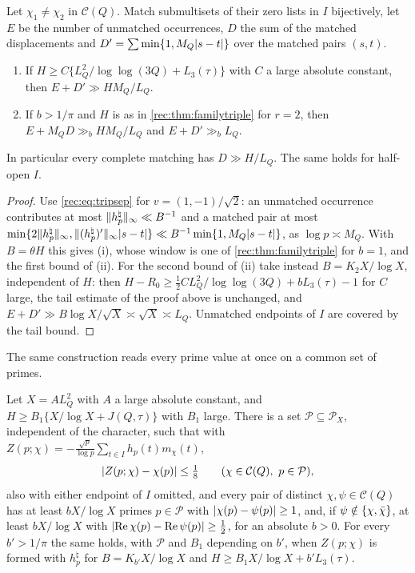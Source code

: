 \begin{corollary}\label{rec:cor:lowmatch}
Let $\chi_1\ne\chi_2$ in $\mathcal C(Q)$. Match submultisets of their zero lists in $I$ bijectively, let $E$ be the
number of unmatched occurrences, $D$ the sum of the matched displacements and
$D'=\sum\min\{1,M_Q\lvert s-t\rvert\}$ over the matched pairs $(s,t)$.
\begin{enumerate}
\item If $H\ge C\{L_Q^2/\log\log(3Q)+L_3(\tau)\}$ with $C$ a large absolute constant, then $E+D'\gg HM_Q/L_Q$.
\item If $b>1/\pi$ and $H$ is as in \cref{rec:thm:familytriple} for $r=2$, then $E+M_QD\gg_bHM_Q/L_Q$ and
$E+D'\gg_bL_Q$.
\end{enumerate}
In particular every complete matching has $D\gg H/L_Q$. The same holds for half-open $I$.
\end{corollary}

\begin{proof}
Use \eqref{rec:eq:tripsep} for $v=(1,-1)/\sqrt2$: an unmatched occurrence contributes at most
$\lVert h_p^\natural\rVert_\infty\ll B^{-1}$ and a matched pair at most
$\min\{2\lVert h_p^\natural\rVert_\infty,\lVert(h_p^\natural)'\rVert_\infty\lvert s-t\rvert\}\ll B^{-1}\min\{1,M_Q\lvert s-t\rvert\}$, as $\log p\asymp M_Q$. With
$B=\theta H$ this gives (i), whose window is one of \cref{rec:thm:familytriple} for $b=1$, and the first
bound of (ii). For the second bound of (ii) take instead $B=K_2X/\log X$, independent of $H$: then
$H-R_0\ge\tfrac12CL_Q^2/\log\log(3Q)+bL_3(\tau)-1$ for $C$ large, the tail estimate of the proof above is
unchanged, and $E+D'\gg B\log X/\sqrt X\asymp\sqrt X\asymp L_Q$. Unmatched endpoints of $I$ are covered by the
tail bound.
\end{proof}

The same construction reads every prime value at once on a common set of primes.

\begin{proposition}\label{rec:prop:read}
Let $X=AL_Q^2$ with $A$ a large absolute constant, and $H\ge B_1\{X/\log X+J(Q,\tau)\}$ with $B_1$ large.
There is a set $\mathcal P\subseteq\mathcal P_X$, independent of the character, such that with
$Z(p;\chi)=-\frac{\sqrt p}{\log p}\sum_{t\in I}h_p(t)m_\chi(t)$,
\[
 \lvert Z(p;\chi)-\chi(p)\rvert\le\tfrac18\qquad(\chi\in\mathcal C(Q),\ p\in\mathcal P),
\]
also with either endpoint of $I$ omitted, and every pair of distinct $\chi,\psi\in\mathcal C(Q)$ has at least
$bX/\log X$ primes $p\in\mathcal P$ with $\lvert\chi(p)-\psi(p)\rvert\ge1$, and, if $\psi\notin\{\chi,\bar\chi\}$, at least
$bX/\log X$ with $\lvert\operatorname{Re}\chi(p)-\operatorname{Re}\psi(p)\rvert\ge\tfrac12$, for an absolute $b>0$. For every $b'>1/\pi$ the same
holds, with $\mathcal P$ and $B_1$ depending on $b'$, when $Z(p;\chi)$ is formed with $h_p^\natural$ for
$B=K_{b'}X/\log X$ and $H\ge B_1X/\log X+b'L_3(\tau)$.
\end{proposition}

